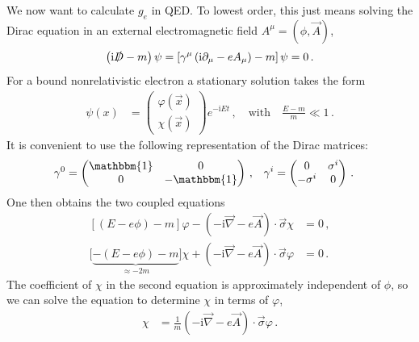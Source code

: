 \documentclass[12pt]{report}
\renewcommand{\slash}[2][4]{\ensuremath{\rlap{\raisebox{1pt}{$\mspace{#1mu}/$}}#2}}
\renewcommand{\i}{\ensuremath{\text{i}}}
\newcommand{\2}{\ensuremath{\sqrt{2}\,}}
\newcommand{\Dslash}{\slash{D}}
\begin{document}
{      We now want to calculate $g_e$ in QED.  To lowest order, this just means solving the Dirac
      equation in an external electromagnetic field $A^\mu=(\phi,\vec{A})$,
      \begin{align}
        \left(\i \Dslash-m\right) \psi =\left[ \gamma^\mu \left(\i \partial_\mu -e A_\mu\right)
          -m\right] \psi=0\,.
      \end{align}
      For a bound nonrelativistic electron a stationary solution takes the form
      \begin{align}
        \psi(x)&= \begin{pmatrix}\varphi(\vec{x})\\ \chi(\vec{x})\end{pmatrix} e^{-\i E t}\,, \quad
          \text{with} \quad \frac{E-m}{m}\ll 1\,.
      \end{align}
      It is convenient to use the following representation of the Dirac matrices:
      \begin{align}\label{eq:gammadirac}
        \gamma^0&=\begin{pmatrix} \mathbbm{1} &0 \\ 0 &-\mathbbm{1}\end{pmatrix}\,,  &
        \gamma^i&=\begin{pmatrix} 0 & \sigma^i \\ -\sigma^i &0\end{pmatrix}\,.
      \end{align}
      One then obtains the two coupled equations
      \begin{subequations}
        \begin{align}
          \left[\left(E- e\phi\right) -m \right]\varphi  -\left(-\i \vec{\nabla} -e
            \vec{A}\right)\cdot \vec{\sigma} \chi &=0\,, \label{eq:prepauli1}\\ 
          \big[\underbrace{-\left(E- e\phi\right) -m}_{\approx -2m}\big] \chi
          +\left(-\i\vec{\nabla} -e \vec{A}\right)\cdot \vec{\sigma} \varphi &=0 \,. \label{eq:prepauli2}
        \end{align}
      \end{subequations}
      The coefficient of $\chi$ in the second equation is approximately independent of $\phi$, so we
      can solve the equation to determine $\chi$ in terms of $\varphi$,
      \begin{align}
        \chi&= \frac{1}{m} \left(-\i\vec{\nabla} -e\vec{A}\right)\cdot \vec{\sigma}\varphi \,.
      \end{align}      
}
\end{document}
